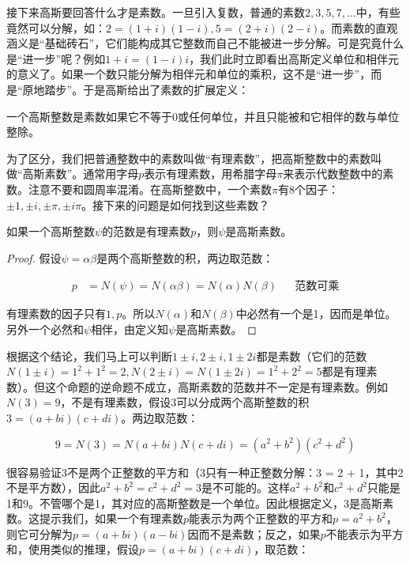 \documentclass[b5paper]{ctexart}
\begin{document}
接下来高斯要回答什么才是素数。一旦引入复数，普通的素数$2, 3, 5, 7, \dotsc$中，有些竟然可以分解，如：$2 = (1 + i)(1 - i), 5 = (2 + i)(2 - i)$。而素数的直观涵义是“基础砖石”，它们能构成其它整数而自己不能被进一步分解。可是究竟什么是“进一步”呢？例如$1 + i = (1 - i)i$，我们此时立即看出高斯定义单位和相伴元的意义了。如果一个数只能分解为相伴元和单位的乘积，这不是“进一步”，而是“原地踏步”。于是高斯给出了素数的扩展定义：

\begin{definition}
一个高斯整数是素数如果它不等于0或任何单位，并且只能被和它相伴的数与单位整除。
\end{definition}

 
为了区分，我们把普通整数中的素数叫做“有理素数”，把高斯整数中的素数叫做“高斯素数”。通常用字母$p$表示有理素数，用希腊字母$\pi$来表示代数整数中的素数。注意不要和圆周率混淆。在高斯整数中，一个素数$\pi$有8个因子：$\pm 1, \pm i, \pm \pi, \pm i\pi$。接下来的问题是如何找到这些素数？

\begin{proposition}\label{thm:prime-norm}
如果一个高斯整数$\psi$的范数是有理素数$p$，则$\psi$是高斯素数。
\end{proposition}

\begin{proof}
假设$\psi = \alpha\beta$是两个高斯整数的积，两边取范数：

\begin{align*}
p &= N(\psi) = N(\alpha\beta) = N(\alpha)N(\beta)  && \text{范数可乘}
\end{align*}

有理素数的因子只有$1, p$。所以$N(\alpha)$和$N(\beta)$中必然有一个是1，因而是单位。另外一个必然和$\psi$相伴，由定义知$\psi$是高斯素数。
\end{proof}

根据这个结论，我们马上可以判断$1 \pm i, 2 \pm i, 1 \pm 2i$都是素数（它们的范数$N(1 \pm i) = 1^2 + 1^2 = 2, N(2 \pm i) = N(1 \pm 2i) = 1^2 + 2^2 = 5$都是有理素数）。但这个命题的逆命题不成立，高斯素数的范数并不一定是有理素数。例如$N(3) = 9$，不是有理素数，假设3可以分成两个高斯整数的积$3 = (a + bi)(c + di)$。两边取范数：

\[
9 = N(3) = N(a + bi)N(c + di) = (a^2 + b^2)(c^2 + d^2)
\]

很容易验证3不是两个正整数的平方和（3只有一种正整数分解：3 = 2 + 1，其中2不是平方数），因此$a^2 + b^2 = c^2 + d^2 = 3$是不可能的。这样$a^2 + b^2$和$c^2 + d^2$只能是1和9。不管哪个是1，其对应的高斯整数是一个单位。因此根据定义，3是高斯素数。这提示我们，如果一个有理素数$p$能表示为两个正整数的平方和$p = a^2 + b^2$，则它可分解为$p = (a + bi)(a - bi)$因而不是素数；反之，如果$p$不能表示为平方和，使用类似的推理，假设$p = (a + bi)(c + di)$，取范数：
\end{document}
